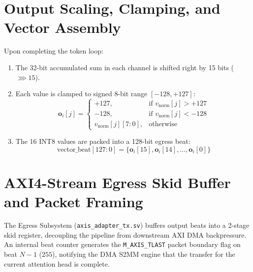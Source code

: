 \section{Output Scaling, Clamping, and Vector Assembly}
Upon completing the token loop:
\begin{enumerate}
    \item The 32-bit accumulated sum in each channel is shifted right by 15 bits ($\ggg 15$).
    \item Each value is clamped to signed 8-bit range $[-128, +127]$:
    \begin{equation}
        \mathbf{o}_i[j] = 
        \begin{cases}
            +127, & \text{if } v_{\text{norm}}[j] > +127 \\
            -128, & \text{if } v_{\text{norm}}[j] < -128 \\
            v_{\text{norm}}[j][7:0], & \text{otherwise}
        \end{cases}
    \end{equation}
    \item The 16 INT8 values are packed into a 128-bit egress beat:
    \begin{equation}
        \text{vector\_beat}[127:0] = \{\mathbf{o}_i[15], \mathbf{o}_i[14], \dots, \mathbf{o}_i[0]\}
    \end{equation}
\end{enumerate}

\section{AXI4-Stream Egress Skid Buffer and Packet Framing}
The Egress Subsystem (\texttt{axis\_adapter\_tx.sv}) buffers output beats into a 2-stage skid register, decoupling the pipeline from downstream AXI DMA backpressure. An internal beat counter generates the \texttt{M\_AXIS\_TLAST} packet boundary flag on beat $N-1$ ($255$), notifying the DMA S2MM engine that the transfer for the current attention head is complete.

